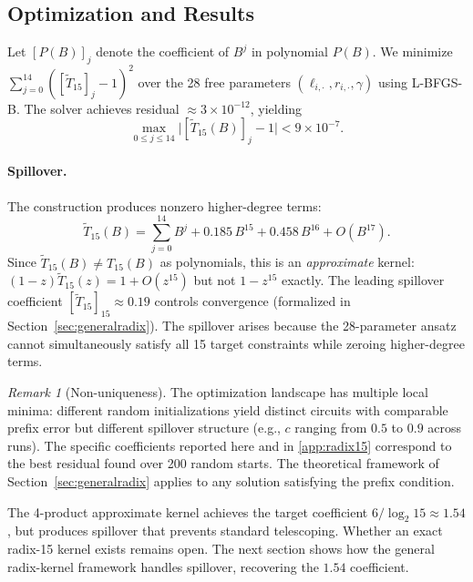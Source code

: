 \documentclass[
  journal=largetwo,
  manuscript=article,
  manuscriptlabel={Research Preprint},
  logo=false,
  simfonts=false,
  year=2026,
  volume=1,
]{cup-journal}
\theoremstyle{definition}
\theoremstyle{remark}
\newtheorem{remark}[theorem]{Remark}
\begin{document}
\subsection{Optimization and Results}

Let $[P(B)]_j$ denote the coefficient of $B^j$ in polynomial $P(B)$.
We minimize $\sum_{j=0}^{14}([\widetilde{T}_{15}]_j - 1)^2$ over
the 28 free parameters
$(\ell_{i,\cdot}, r_{i,\cdot}, \gamma)$ using L-BFGS-B.
The solver achieves residual $\approx 3 \times 10^{-12}$, yielding
\begin{equation*}
  \max_{0 \leq j \leq 14}
  \bigl| [\widetilde{T}_{15}(B)]_j - 1 \bigr| < 9 \times 10^{-7}.
\end{equation*}

\paragraph{Spillover.}
The construction produces nonzero higher-degree terms:
\begin{equation*}
  \widetilde{T}_{15}(B) = \sum_{j=0}^{14} B^j
    + 0.185\, B^{15} + 0.458\, B^{16} + O(B^{17}).
\end{equation*}
Since $\widetilde{T}_{15}(B) \neq T_{15}(B)$ as polynomials, this
is an \emph{approximate} kernel: $(1-z)\widetilde{T}_{15}(z) = 1 + O(z^{15})$
but not $1 - z^{15}$ exactly.
The leading spillover coefficient
$[\widetilde{T}_{15}]_{15} \approx 0.19$ controls convergence
(formalized in Section~\ref{sec:generalradix}).
The spillover arises because the 28-parameter ansatz cannot
simultaneously satisfy all 15 target constraints while zeroing
higher-degree terms.

\begin{remark}[Non-uniqueness]
  \label{rem:nonunique}
  The optimization landscape has multiple local minima: different
  random initializations yield distinct circuits with comparable
  prefix error but different spillover structure (e.g., $c$ ranging
  from $0.5$ to $0.9$ across runs).
  The specific coefficients reported here and in
  \ref{app:radix15} correspond to the best residual found
  over 200 random starts.
  The theoretical framework of Section~\ref{sec:generalradix}
  applies to any solution satisfying the prefix condition.
\end{remark}

The 4-product approximate kernel achieves the target coefficient
$6/\log_2 15 \approx 1.54$, but produces spillover that prevents
standard telescoping.
Whether an exact radix-15 kernel exists remains open.
The next section shows how the general radix-kernel framework
handles spillover, recovering the $1.54$ coefficient.
\end{document}
